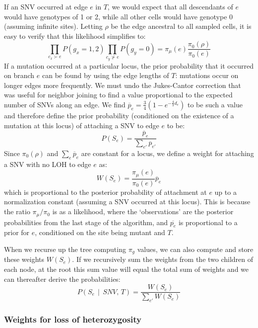 \documentclass[../../main.tex]{subfiles}
\begin{document}
If an SNV occurred at edge $e$ in $T$, we would expect that all descendants of $e$ would have genotypes of 1 or 2, while all other cells would have genotype 0 (assuming infinite sites).
Letting $\rho$ be the edge ancestral to all sampled cells, it is easy to verify that this likelihood simplifies to:
\begin{equation*}
    \prod_{c_x\succ e}P(g_x =1,2)\prod_{c_y\nsucc e} P(g_y = 0) = \pi_\mu(e)\frac{\pi_0(\rho)}{\pi_0(e)}
\end{equation*}
If a mutation occurred at a particular locus, the prior probability that it occurred on branch $e$ can be found by using the edge lengths of $T$: mutations occur on longer edges more frequently.
We must undo the Jukes-Cantor correction that was useful for neighbor joining to find a value proportional to the expected number of SNVs along an edge.
We find $\overline{p}_e = \frac{3}{4}\left(1-e^{-\frac{4}{3}d_e}\right)$ to be such a value and therefore define the prior probability (conditioned on the existence of a mutation at this locus) of attaching a SNV to edge $e$ to be:
\begin{equation*}
    P(S_e) = \frac{\overline{p}_e}{\sum_{e'}\overline{p}_{e'}}
\end{equation*}
Since $\pi_0(\rho)$ and $\sum_{e}\overline{p}_{e}$ are constant for a locus, we define a weight for attaching a SNV with no LOH to edge $e$ as:
\begin{equation*}
    W(S_e) = \frac{\pi_\mu(e)}{\pi_0(e)} \overline{p}_e
\end{equation*}
which is proportional to the posterior probability of attachment at $e$ up to a normalization constant (assuming a SNV occurred at this locus).
This is because the ratio $\pi_\mu/\pi_0$ is as a likelihood, where the `observations' are the posterior probabilities from the last stage of the algorithm, and $\overline{p_e}$ is proportional to a prior for $e$, conditioned on the site being mutant and $T$.

When we recurse up the tree computing $\pi_g$ values, we can also compute and store these weights $W(S_e)$.
If we recursively sum the weights from the two children of each node, at the root this sum value will equal the total sum of weights and we can thereafter derive the probabilities:
\begin{equation} \label{eq:SNVattachP}
    P(S_e\,\mid\,SNV,\,T) = \frac{W(S_e)}{\sum_{e'}W(S_e)}
\end{equation}


\subsubsection*{Weights for loss of heterozygosity}
\end{document}

